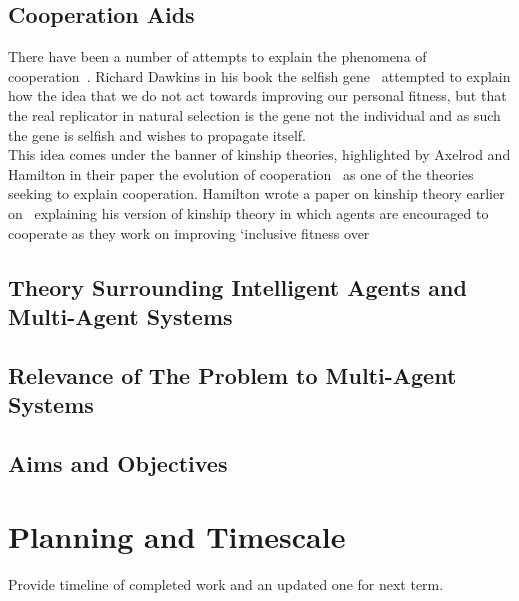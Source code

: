\documentclass[]{final_report}
\begin{document}
\section{Cooperation Aids}
There have been a number of attempts to explain the phenomena of cooperation~\cite{kropotkin1902mutual, selfish_gene, evolution_of_cooperation, five_rules_coop}. Richard Dawkins in his book the selfish gene~\cite{selfish_gene} attempted to explain how the idea that we do not act towards improving our personal fitness, but that the real replicator in natural selection is the gene not the individual and as such the gene is selfish and wishes to propagate itself.\\
This idea comes under the banner of kinship theories, highlighted by Axelrod and Hamilton in their paper the evolution of cooperation~\cite{evolution_of_cooperation} as one of the theories seeking to explain cooperation. Hamilton wrote a paper on kinship theory earlier on~\cite{kinhamilton} explaining his version of kinship theory in which agents are encouraged to cooperate as they work on improving `inclusive fitness over 

\section{Theory Surrounding Intelligent Agents and Multi-Agent Systems}

\section{Relevance of The Problem to Multi-Agent Systems}

\section{Aims and Objectives}

\chapter{Planning and Timescale}
Provide timeline of completed work and an updated one for next term.
\end{document}
